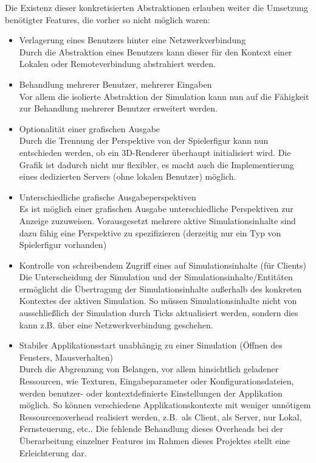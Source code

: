 \documentclass[11pt,twoside,a4paper]{article}
\begin{document}
Die Existenz dieser konkretisierten Abstraktionen erlauben weiter die Umsetzung benötigter Features, die vorher so nicht möglich waren:
\begin{itemize}
\item Verlagerung eines Benutzers hinter eine Netzwerkverbindung\\
	Durch die Abstraktion eines Benutzers kann dieser für den Kontext einer Lokalen oder Remoteverbindung abstrahiert werden.
\item Behandlung mehrerer Benutzer, mehrerer Eingaben\\
	Vor allem die isolierte Abstraktion der Simulation kann nun auf die Fähigkeit zur Behandlung mehrerer Benutzer erweitert werden.
\item Optionalität einer grafischen Ausgabe\\
	Durch die Trennung der Perspektive von der Spielerfigur kann nun entschieden werden, ob ein 3D-Renderer überhaupt initialisiert wird. Die Grafik ist dadurch nicht nur flexibler, es macht auch die Implementierung eines dedizierten Servers (ohne lokalen Benutzer) möglich.
\item Unterschiedliche grafische Ausgabeperspektiven\\
	Es ist möglich einer grafischen Ausgabe unterschiedliche Perspektiven zur Anzeige zuzuweisen. Vorausgesetzt mehrere aktive Simulationsinhalte sind dazu fähig eine Perspektive zu spezifizieren (derzeitig nur ein Typ von Spielerfigur vorhanden)
\item Kontrolle von schreibendem Zugriff eines auf Simulationsinhalte (für Clients)\\
Die Unterscheidung der Simulation und der Simulationsinhalte/Entitäten ermöglicht die Übertragung der Simulationsinhalte außerhalb des konkreten Kontextes der aktiven Simulation. So müssen Simulationsinhalte nicht von ausschließlich der Simulation durch Ticks aktualisiert werden, sondern dies kann z.B. über eine Netzwerkverbindung geschehen.
\item Stabiler Applikationsstart unabhängig zu einer Simulation (Öffnen des Fensters, Mausverhalten)\\
Durch die Abgrenzung von Belangen, vor allem hinsichtlich geladener Ressourcen, wie Texturen, Eingabeparameter oder Konfigurationsdateien, werden benutzer- oder kontextdefinierte Einstellungen der Applikation möglich. So können verschiedene Applikationskontexte mit weniger unnötigem Ressourcenoverhead realisiert werden, z.B.~als Client, als Server, nur Lokal, Fernsteuerung, etc.. Die fehlende Behandlung dieses Overheads bei der Überarbeitung einzelner Features im Rahmen dieses Projektes stellt eine Erleichterung dar.
\end{itemize}
\end{document}
